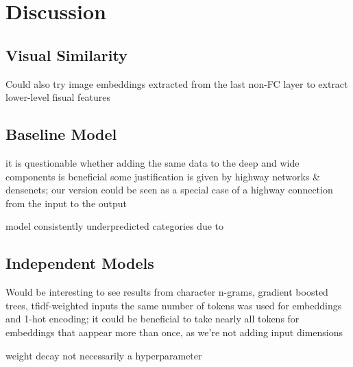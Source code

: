 \chapter{Discussion}

\section{Visual Similarity}

Could also try image embeddings extracted from the last non-FC layer to extract lower-level fisual features

\section{Baseline Model}

it is questionable whether adding the same data to the deep and wide components is beneficial
  some justification is given by highway networks \& densenets; our version could be seen as a special case of a highway connection from the input to the output

model consistently underpredicted categories due to

\section{Independent Models}

Would be interesting to see results from character n-grams, gradient boosted trees, tfidf-weighted inputs
the same number of tokens was used for embeddings and 1-hot encoding; it could be beneficial to take nearly all tokens for embeddings that aappear more than once, as we're not adding input dimensions

weight decay not necessarily a hyperparameter
